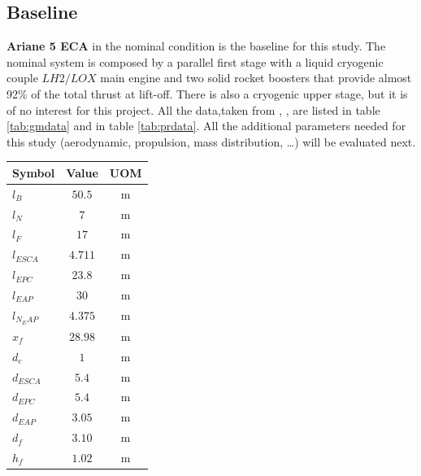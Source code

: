 \documentclass[12pt,fleqn,openany]{book} %
\begin{document}
\subsection{Baseline}
\textbf{Ariane 5 ECA} in the nominal condition is the baseline for this study. The nominal system is composed by a parallel first stage with a liquid cryogenic couple $LH2/LOX$ main engine and two solid rocket boosters that provide almost 92\% of the total thrust at lift-off. There is also a cryogenic upper stage, but it is of no interest for this project. All the data,taken from \cite{bib:4}, \cite{bib:5}, \cite{bib:6} are listed in table \hypertarget{tab:gmdata}{\ref{tab:gmdata}} and in table \hypertarget{tab:prdata}{\ref{tab:prdata}}. All the additional parameters needed for this study (aerodynamic, propulsion, mass distribution, …) will be evaluated next.
\begin{table}[h]
	\centering
	\begin{tabular}{ l c c}
		\toprule
		Symbol									&Value 				&UOM	\\
		\midrule                                                                                                             
		$l_B  		$							&$50.5  $          &\si{\meter}        \\  
		$l_N  		$							&$7     $          &\si{\meter}        \\  
		$l_F  		$							&$17    $          &\si{\meter}        \\  
		$l_{ESCA}  	$							&$4.711 $          &\si{\meter}        \\
		$l_{EPC}  	$								&$23.8  $      &\si{\meter}        \\    
		$l_{EAP}  	$								&$30    $      &\si{\meter}        \\    
		$l_{N_EAP}  	$							&$4.375 $      &\si{\meter}        \\  
		$x_f  		$							&$28.98 $          &\si{\meter}        \\  
		$d_c  		$							&$1     $          &\si{\meter}        \\  
		$d_{ESCA}  	$							&$5.4   $          &\si{\meter}        \\
		$d_{EPC } 	$								&$5.4	$      &\si{\meter}        \\    
		$d_{EAP } 	$								&$3.05  $      &\si{\meter}        \\    
		$d_f  		$							&$3.10  $          &\si{\meter}        \\  
		$h_f  		$							&$1.02  $          &\si{\meter}        \\  

\end{tabular}
\end{table}
\end{document}
